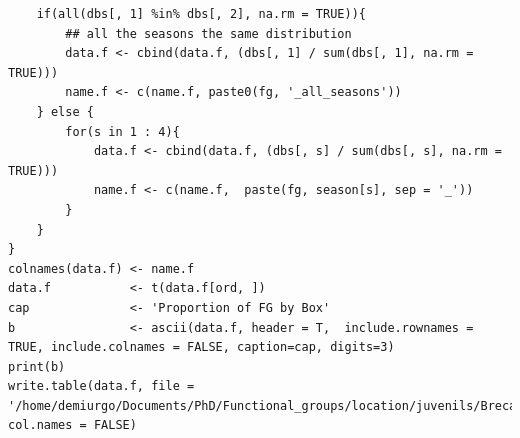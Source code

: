\documentclass[11pt]{article}
\begin{document}
\begin{itemize}
\begin{itemize}
\begin{itemize}
\begin{verbatim}
    if(all(dbs[, 1] %in% dbs[, 2], na.rm = TRUE)){
        ## all the seasons the same distribution
        data.f <- cbind(data.f, (dbs[, 1] / sum(dbs[, 1], na.rm = TRUE)))
        name.f <- c(name.f, paste0(fg, '_all_seasons'))
    } else {
        for(s in 1 : 4){
            data.f <- cbind(data.f, (dbs[, s] / sum(dbs[, s], na.rm = TRUE)))
            name.f <- c(name.f,  paste(fg, season[s], sep = '_'))
        }
    }
}
colnames(data.f) <- name.f
data.f           <- t(data.f[ord, ])
cap              <- 'Proportion of FG by Box'
b                <- ascii(data.f, header = T,  include.rownames = TRUE, include.colnames = FALSE, caption=cap, digits=3)
print(b)
write.table(data.f, file = '/home/demiurgo/Documents/PhD/Functional_groups/location/juvenils/Breca/Breca_dist_fin.csv', col.names = FALSE)
\end{verbatim}


\end{itemize}
\end{itemize}
\end{itemize}
\end{document}
